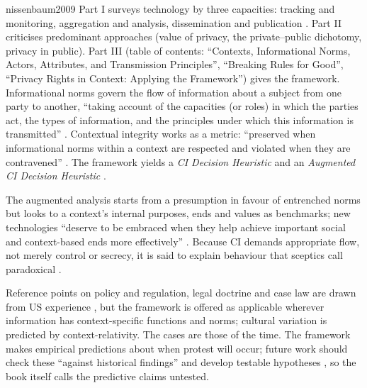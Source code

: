 \begin{papercard}{nissenbaum2009}
 Part I surveys technology by three capacities: tracking and monitoring, aggregation and analysis, dissemination and publication . Part II criticises predominant approaches (value of privacy, the private--public dichotomy, privacy in public). Part III (table of contents: ``Contexts, Informational Norms, Actors, Attributes, and Transmission Principles'', ``Breaking Rules for Good'', ``Privacy Rights in Context: Applying the Framework'')  gives the framework. Informational norms govern the flow of information about a subject from one party to another, ``taking account of the capacities (or roles) in which the parties act, the types of information, and the principles under which this information is transmitted'' . Contextual integrity works as a metric: ``preserved when informational norms within a context are respected and violated when they are contravened'' . The framework yields a \emph{CI Decision Heuristic} and an \emph{Augmented CI Decision Heuristic} .

 The augmented analysis starts from a presumption in favour of entrenched norms but looks to a context's internal purposes, ends and values as benchmarks; new technologies ``deserve to be embraced when they help achieve important social and context-based ends more effectively'' . Because CI demands appropriate flow, not merely control or secrecy, it is said to explain behaviour that sceptics call paradoxical .

 Reference points on policy and regulation, legal doctrine and case law are drawn from US experience , but the framework is offered as applicable wherever information has context-specific functions and norms; cultural variation is predicted by context-relativity. The cases are those of the time. The framework makes empirical predictions about when protest will occur; future work should check these ``against historical findings'' and develop testable hypotheses , so the book itself calls the predictive claims untested.


\end{papercard}
